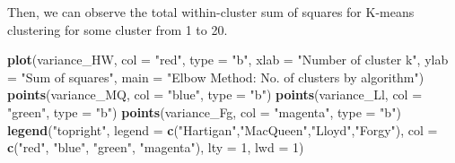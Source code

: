 \documentclass[11pt,]{article}
\newenvironment{Shaded}{\begin{snugshade}}{\end{snugshade}}
\newcommand{\KeywordTok}[1]{\textcolor[rgb]{0.13,0.29,0.53}{\textbf{#1}}}
\newcommand{\DataTypeTok}[1]{\textcolor[rgb]{0.13,0.29,0.53}{#1}}
\newcommand{\DecValTok}[1]{\textcolor[rgb]{0.00,0.00,0.81}{#1}}
\newcommand{\StringTok}[1]{\textcolor[rgb]{0.31,0.60,0.02}{#1}}
\newcommand{\CommentTok}[1]{\textcolor[rgb]{0.56,0.35,0.01}{\textit{#1}}}
\newcommand{\ControlFlowTok}[1]{\textcolor[rgb]{0.13,0.29,0.53}{\textbf{#1}}}
\newcommand{\OperatorTok}[1]{\textcolor[rgb]{0.81,0.36,0.00}{\textbf{#1}}}
\newcommand{\NormalTok}[1]{#1}
\begin{document}
\begin{Shaded}
\end{Shaded}

Then, we can observe the total within-cluster sum of squares for K-means
clustering for some cluster from 1 to 20.

\begin{Shaded}
\begin{Highlighting}[]
\KeywordTok{plot}\NormalTok{(variance_HW, }
     \DataTypeTok{col =} \StringTok{"red"}\NormalTok{,}
     \DataTypeTok{type =} \StringTok{"b"}\NormalTok{, }
     \DataTypeTok{xlab =} \StringTok{"Number of cluster k"}\NormalTok{,}
     \DataTypeTok{ylab =} \StringTok{"Sum of squares"}\NormalTok{, }
     \DataTypeTok{main =} \StringTok{"Elbow Method: No. of clusters by algorithm"}\NormalTok{)}
\KeywordTok{points}\NormalTok{(variance_MQ, }\DataTypeTok{col =} \StringTok{"blue"}\NormalTok{, }\DataTypeTok{type =} \StringTok{"b"}\NormalTok{)}
\KeywordTok{points}\NormalTok{(variance_Ll, }\DataTypeTok{col =} \StringTok{"green"}\NormalTok{, }\DataTypeTok{type =} \StringTok{"b"}\NormalTok{)}
\KeywordTok{points}\NormalTok{(variance_Fg, }\DataTypeTok{col =} \StringTok{"magenta"}\NormalTok{, }\DataTypeTok{type =} \StringTok{"b"}\NormalTok{)}
\KeywordTok{legend}\NormalTok{(}\StringTok{"topright"}\NormalTok{,}
       \DataTypeTok{legend =} \KeywordTok{c}\NormalTok{(}\StringTok{"Hartigan"}\NormalTok{,}\StringTok{"MacQueen"}\NormalTok{,}\StringTok{"Lloyd"}\NormalTok{,}\StringTok{"Forgy"}\NormalTok{), }
       \DataTypeTok{col =} \KeywordTok{c}\NormalTok{(}\StringTok{"red"}\NormalTok{, }\StringTok{"blue"}\NormalTok{, }\StringTok{"green"}\NormalTok{, }\StringTok{"magenta"}\NormalTok{), }
       \DataTypeTok{lty =} \DecValTok{1}\NormalTok{, }
       \DataTypeTok{lwd =} \DecValTok{1}\NormalTok{)}
\end{Highlighting}
\end{Shaded}
\end{document}
